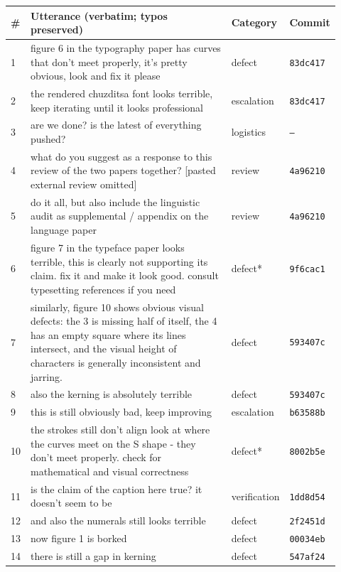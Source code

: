 \begin{longtable}{@{}p{0.04\linewidth}p{0.66\linewidth}p{0.13\linewidth}p{0.09\linewidth}@{}}
\toprule
\# & Utterance (verbatim; typos preserved) & Category & Commit \\
\midrule
\endhead
1 & figure 6 in the typography paper has curves that don't meet properly, it's pretty obvious, look and fix it please & defect & \texttt{83dc417} \\
2 & the rendered chuzditsa font looks terrible, keep iterating until it looks professional & escalation & \texttt{83dc417} \\
3 & are we done? is the latest of everything pushed? & logistics & \texttt{—} \\
4 & what do you suggest as a response to this review of the two papers together? [pasted external review omitted] & review & \texttt{4a96210} \\
5 & do it all, but also include the linguistic audit as supplemental / appendix on the language paper & review & \texttt{4a96210} \\
6 & figure 7 in the typeface paper looks terrible, this is clearly not supporting its claim. fix it and make it look good. consult typesetting references if you need & defect* & \texttt{9f6cac1} \\
7 & similarly, figure 10 shows obvious visual defects: the 3 is missing half of itself, the 4 has an empty square where its lines intersect, and the visual height of characters is generally inconsistent and jarring. & defect & \texttt{593407c} \\
8 & also the kerning is absolutely terrible & defect & \texttt{593407c} \\
9 & this is still obviously bad, keep improving & escalation & \texttt{b63588b} \\
10 & the strokes still don't align look at where the curves meet on the S shape - they don't meet properly. check for mathematical and visual correctness & defect* & \texttt{8002b5e} \\
11 & is the claim of the caption here true? it doesn't seem to be & verification & \texttt{1dd8d54} \\
12 & and also the numerals still looks terrible & defect & \texttt{2f2451d} \\
13 & now figure 1 is borked & defect & \texttt{00034eb} \\
14 & there is still a gap in kerning & defect & \texttt{547af24} \\

\end{longtable}
